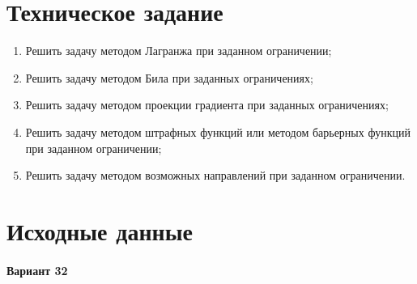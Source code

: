 





\tableofcontents
\listoffigures
\listoftables
\newpage

\section{Техническое задание}

\begin{enumerate}
	\item Решить задачу методом Лагранжа при заданном ограничении;
	\item Решить задачу методом Била при заданных ограничениях;
	\item Решить задачу методом проекции градиента при заданных ограничениях;
	\item Решить задачу методом штрафных функций или методом барьерных функций при
заданном ограничении;
	\item Решить задачу методом возможных направлений при заданном ограничении.
\end{enumerate}

\section{Исходные данные}

\paragraph{Вариант 32}

